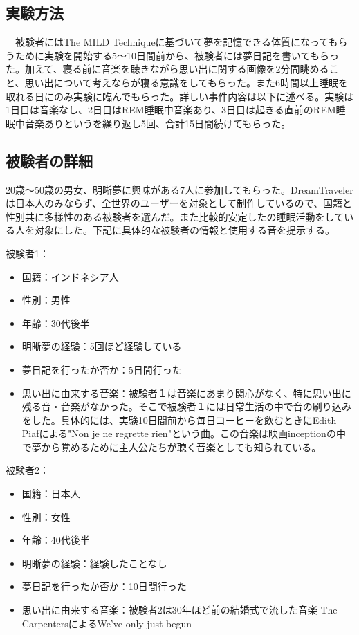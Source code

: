 \subsection{実験方法}
　被験者にはThe MILD Techniqueに基づいて夢を記憶できる体質になってもらうために実験を開始する5〜10日間前から、被験者には夢日記を書いてもらった。加えて、寝る前に音楽を聴きながら思い出に関する画像を2分間眺めること、思い出について考えならが寝る意識をしてもらった。また6時間以上睡眠を取れる日にのみ実験に臨んでもらった。詳しい事件内容は以下に述べる。実験は1日目は音楽なし、2日目はREM睡眠中音楽あり、3日目は起きる直前のREM睡眠中音楽ありというを繰り返し5回、合計15日間続けてもらった。

\subsection{被験者の詳細}
20歳〜50歳の男女、明晰夢に興味がある7人に参加してもらった。DreamTravelerは日本人のみならず、全世界のユーザーを対象として制作しているので、国籍と性別共に多様性のある被験者を選んだ。また比較的安定したの睡眠活動をしている人を対象にした。下記に具体的な被験者の情報と使用する音を提示する。

被験者1：
\begin{itemize}
\item 国籍：インドネシア人
\item 性別：男性
\item 年齢：30代後半
\item 明晰夢の経験：5回ほど経験している
\item 夢日記を行ったか否か：5日間行った
\item 思い出に由来する音楽：被験者１は音楽にあまり関心がなく、特に思い出に残る音・音楽がなかった。そこで被験者１には日常生活の中で音の刷り込みをした。具体的には、実験10日間前から毎日コーヒーを飲むときにEdith Piafによる"Non je ne regrette rien"という曲。この音楽は映画inceptionの中で夢から覚めるために主人公たちが聴く音楽としても知られている。

\end{itemize}

被験者2：
\begin{itemize}
\item 国籍：日本人
\item 性別：女性
\item 年齢：40代後半
\item 明晰夢の経験：経験したことなし
\item 夢日記を行ったか否か：10日間行った
\item 思い出に由来する音楽：被験者2は30年ほど前の結婚式で流した音楽 The CarpentersによるWe've only just begun
\end{itemize}

